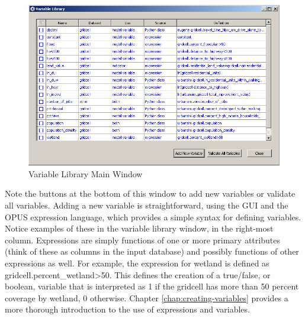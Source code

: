 \begin{figure}[htp]
\begin{center}
\includegraphics[scale=0.6]{part-gui/images/model-manager-variable-library-main.png}
\end{center}
\caption{Variable Library Main Window}
\label{fig:variable-library-main}
\end{figure}

Note the buttons at the bottom of this window to add new variables or validate all variables.  Adding a new variable is straightforward, using the GUI and the OPUS expression language, which provides a simple syntax for defining variables.  Notice examples of these in the variable library window, in the right-most column.  Expressions are simply functions of one or more primary attributes (think of these as columns in the input database) and possibly functions of other expressions as well.  For example, the expression for wetland is defined as gridcell.percent_wetland>50.  This defines the creation of a true/false, or boolean, variable that is interpreted as 1 if the gridcell has more than 50 percent coverage by wetland, 0 otherwise. Chapter \ref{chap:creating-variables} provides a more thorough introduction to the use of expressions and variables.

